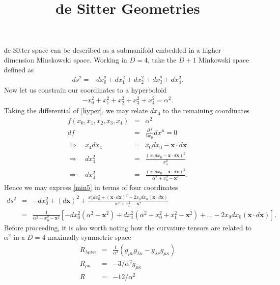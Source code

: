 \documentclass[10pt,letterpaper]{article}
\title{de Sitter Geometries}
\date{}
\begin{document}
 
	\maketitle
	\noindent 
de Sitter space can be described as a submanifold embedded in a higher dimension Minskowski space. Working in $D=4$, take the $D+1$ Minkowski space defined as
\begin{eqnarray}
ds^2 = -dx_0^2 + dx_1^2 + dx_2^2 + dx_3^2 + dx_4^2.
\label{min5}
\end{eqnarray}
Now let us constrain our coordinates to a hyperboloid
\begin{eqnarray}
-x_0^2 + x_1^2 + x_2^2 + x_3^2 + x_4^2 = \alpha^2.
\label{hyper}
\end{eqnarray}
Taking the differential of \eqref{hyper},  we may relate $dx_4$ to the remaining coordinates
\begin{eqnarray}
f(x_0,x_1,x_2,x_3,x_4) &=& \alpha^2
\nonumber\\
df &=& \frac{\partial f}{\partial x_\mu}dx^\mu =0
\nonumber\\
\Rightarrow\quad x_4 dx_4 &=&x_0 dx_0-\mathbf x\cdot d\mathbf x 
\nonumber\\
\Rightarrow\quad dx_4^2 &=& \frac{(x_0 dx_0-\mathbf x\cdot d\mathbf x)^2}{x_4^2}
\nonumber\\
\Rightarrow\quad dx_4^2 &=& \frac{(x_0 dx_0 -\mathbf x\cdot d\mathbf x)^2}{\alpha^2+x_0^2 -\mathbf x^2}.
\end{eqnarray}
Hence we may express \eqref{min5} in terms of four coordinates
\begin{eqnarray}
ds^2 &=& -dx_0^2 + (d\mathbf x)^2 + \frac{x_0^2 dx_0^2 + (\mathbf x\cdot d\mathbf x)^2 - 2x_0 dx_0 (\mathbf x\cdot d\mathbf x)}{\alpha^2 + x_0^2 -\mathbf x^2}
\nonumber\\
&=& \frac{1}{\alpha^2 + x_0^2-\mathbf x^2}\left[ 
-dx_0^2(\alpha^2-\mathbf x^2) + dx_1^2(\alpha^2 +x_0^2 + x_1^2-\mathbf x^2) + ... -2 x_0 dx_0(\mathbf x\cdot d\mathbf x)\right].
\label{ds2}
\end{eqnarray}
Before proceeding, it is also worth noting how the curvature tensors are related to $\alpha^2$ in a $D=4$ maximally symmetric space
\begin{eqnarray}
R_{\lambda\mu\nu\kappa} &=& \frac{1}{\alpha^2}( g_{\mu\nu}g_{\lambda\kappa}-g_{\lambda\nu}g_{\mu\kappa})
\nonumber\\
R_{\mu\kappa}&=& -3/\alpha^2 g_{\mu\kappa}
\nonumber\\
R &=& -12/\alpha^2
\label{curverel}
\end{eqnarray}
\end{document}
